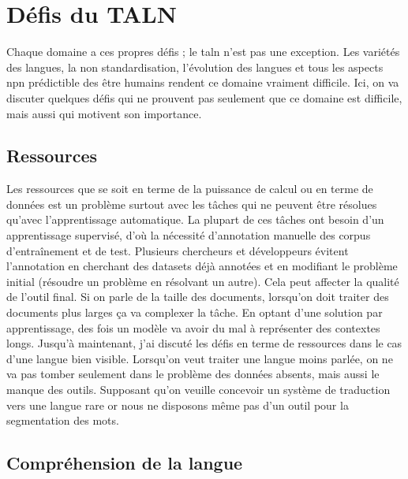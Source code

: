 \documentclass{KodeBook}
\begin{document}
\section{Défis du TALN}

Chaque domaine a ces propres défis ; le \ac{taln} n'est pas une exception. 
Les variétés des langues, la non standardisation, l'évolution des langues et tous les aspects npn prédictible des être humains rendent ce domaine vraiment difficile.
Ici, on va discuter quelques défis qui ne prouvent pas seulement que ce domaine est difficile, mais aussi qui motivent son importance.

\subsection{Ressources}

Les ressources que se soit en terme de la puissance de calcul ou en terme de données est un problème surtout avec les tâches qui ne peuvent être résolues qu'avec l'apprentissage automatique.
La plupart de ces tâches ont besoin d'un apprentissage supervisé, d'où la nécessité d'annotation manuelle des corpus d'entraînement et de test. 
Plusieurs chercheurs et développeurs évitent l'annotation en cherchant des datasets déjà annotées et en modifiant le problème initial (résoudre un problème en résolvant un autre). 
Cela peut affecter la qualité de l'outil final. 
Si on parle de la taille des documents, lorsqu'on doit traiter des documents plus larges ça va complexer la tâche. 
En optant d'une solution par apprentissage, des fois un modèle va avoir du mal à représenter des contextes longs. 
Jusqu'à maintenant, j'ai discuté les défis en terme de ressources dans le cas d'une langue bien visible. 
Lorsqu'on veut traiter une langue moins parlée, on ne va pas tomber seulement dans le problème des données absents, mais aussi le manque des outils. 
Supposant qu'on veuille concevoir un système de traduction vers une langue rare or nous ne disposons même pas d'un outil pour la segmentation des mots.

\subsection{Compréhension de la langue}
\end{document}
